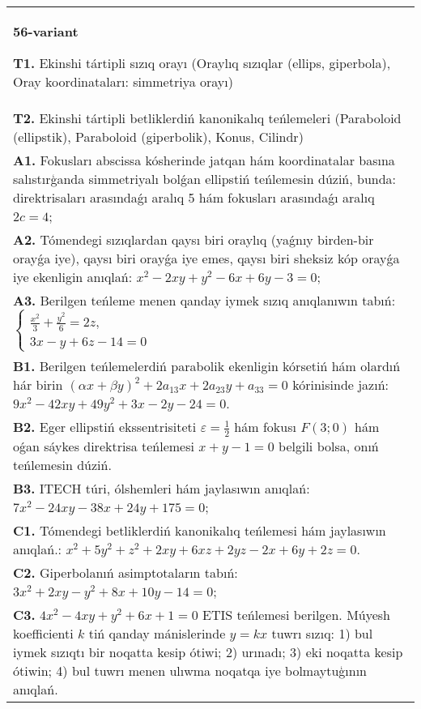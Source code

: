 \documentclass{article}
\begin{document}
\begin{tabular}{m{17cm}}
\textbf{56-variant}
\newline

\textbf{T1.} Ekinshi tártipli sızıq orayı (Oraylıq sızıqlar (ellips, giperbola), Oray koordinataları: simmetriya orayı) \\
\textbf{T2.} Ekinshi tártipli betliklerdiń kanonikalıq teńlemeleri (Paraboloid (ellipstik), Paraboloid (giperbolik), Konus, Cilindr) \\
\textbf{A1.} Fokusları abscissa kósherinde jatqan hám koordinatalar basına salıstırģanda simmetriyalı bolǵan ellipstiń teńlemesin dúziń, bunda: direktrisaları arasındaǵı aralıq 5 hám fokusları arasındaǵı aralıq $2c=4$; \\
\textbf{A2.} Tómendegi sızıqlardan qaysı biri oraylıq (yaǵnıy birden-bir orayǵa iye), qaysı biri orayǵa iye emes, qaysı biri sheksiz kóp orayǵa iye ekenligin anıqlań:  $x^2-2 x y+y^2-6 x+6 y-3=0$; \\
\textbf{A3.} Berilgen teńleme menen qanday iymek sızıq anıqlanıwın tabıń: $\left\{\begin{array}{l}\frac{x^2}{3}+\frac{y^2}{6}=2 z, \\ 3 x-y+6 z-14=0\end{array}\right.$ \\
\textbf{B1.} Berilgen teńlemelerdiń parabolik ekenligin kórsetiń hám olardıń hár birin $(\alpha x+\beta y)^2+2 a_{13} x+2 a_{23} y+a_{33}=0$ kórinisinde jazıń:  $9 x^2-42 x y+49 y^2+3 x-2 y-24=0$. \\
\textbf{B2.} Eger ellipstiń ekssentrisiteti $\varepsilon=\frac{1}{2}$ hám fokusı $F (3; 0) $ hám oǵan sáykes direktrisa teńlemesi $x+y-1=0$ belgili bolsa, onıń teńlemesin dúziń. \\
\textbf{B3.} ITECH túri, ólshemleri hám jaylasıwın anıqlań: $7 x^2-24 x y-38 x+24 y+175=0$; \\
\textbf{C1.} Tómendegi betliklerdiń kanonikalıq teńlemesi hám jaylasıwın anıqlań.: $x^2+5 y^2+z^2+2 x y+6 x z+2 y z-2 x+6 y+2 z=0$. \\
\textbf{C2.} Giperbolanıń asimptotaların tabıń: $3 x^2+2 x y-y^2+8 x+10 y-14=0$; \\
\textbf{C3.} $4 x^2-4 x y+y^2+6 x+1=0$ ETIS teńlemesi berilgen. Múyesh koefficienti $k$ tiń qanday mánislerinde $y=kx$ tuwrı sızıq: 1) bul iymek sızıqtı bir noqatta kesip ótiwi; 2) urınadı; 3) eki noqatta kesip ótiwin; 4) bul tuwrı menen ulıwma noqatqa iye bolmaytuģının anıqlań. \\

\end{tabular}
\vspace{1cm}
\end{document}
